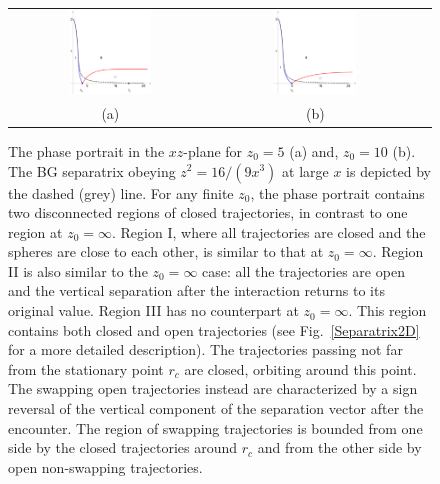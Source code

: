 \begin{figure}
\begin{tabular}{ccc}
\includegraphics[width=0.43\textwidth]{Fig4a.pdf} \hspace{1cm} &
\includegraphics[width=0.43\textwidth]{Fig4b.pdf}
\\
(a) & (b)
\end{tabular}
\caption{The phase portrait in the $xz$-plane for $z_0=5$ (a) and,
$z_0=10$ (b). The BG separatrix obeying $z^2=16/(9x^3)$ at large $x$ is depicted by the dashed (grey) line. For any finite $z_0$, the phase portrait contains two disconnected regions of closed trajectories, in contrast to one region at $z_0=\infty$. Region I, where all trajectories are closed and the spheres are close to each other, is similar to that at $z_0=\infty$. Region II is also similar to the $z_0=\infty$ case: all the trajectories are open and the vertical separation after the interaction returns to its original value.
Region III has no counterpart at $z_0=\infty$. This region contains both closed and open trajectories (see Fig.~\ref{Separatrix2D} for a more detailed description). The trajectories passing not far from the stationary point $r_c$ are closed, orbiting around this point. The swapping open trajectories instead are characterized by a sign reversal of the vertical component of the separation vector after the encounter. The region of swapping trajectories is bounded from one
side by the closed trajectories around $r_c$ and from the other side by open non-swapping trajectories.}
\label{fig:Fig4a}
\end{figure}

